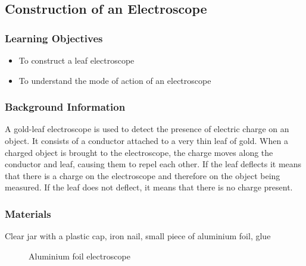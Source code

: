 \subsection{Construction of an Electroscope}

\subsubsection*{Learning Objectives}
\begin{itemize}
\item{To construct a leaf electroscope} 
\item{To understand the mode of action of an electroscope} 
\end{itemize}

\subsubsection*{Background Information}
A gold-leaf electroscope is used to detect the presence of electric charge on an object. It consists of a conductor attached to a very thin leaf of gold. When a charged object is brought to the electroscope, the charge moves along the conductor and leaf, causing them to repel each other. If the leaf deflects it means that there is a charge on the electroscope and therefore on the object being measured. If the leaf does not deflect, it means that there is no charge present. 

\subsubsection*{Materials}
Clear jar with a plastic cap, iron nail, small piece of aluminium foil, glue

\begin{figure}[h!]
\begin{center}
\def\svgwidth{350pt}

\caption{Aluminium foil electroscope}
\label{fig:al-leaf-electroscope}
\end{center}
\end{figure}

